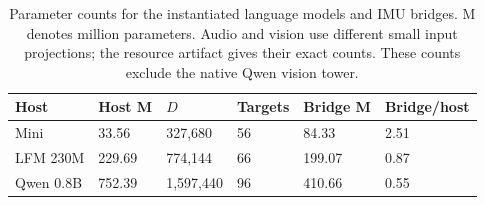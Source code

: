 \begin{table}[!htbp]\centering\small
\setlength{\tabcolsep}{4pt}
\caption{Parameter counts for the instantiated language models and IMU bridges. M denotes million parameters. Audio and vision use different small input projections; the resource artifact gives their exact counts. These counts exclude the native Qwen vision tower.}\label{tab:hosts}
\begin{tabular}{@{}llllll@{}}
\toprule
Host & Host M & $D$ & Targets & Bridge M & Bridge/host \\
\midrule
Mini & 33.56 & 327,680 & 56 & 84.33 & 2.51 \\
LFM 230M & 229.69 & 774,144 & 66 & 199.07 & 0.87 \\
Qwen 0.8B & 752.39 & 1,597,440 & 96 & 410.66 & 0.55 \\
\bottomrule
\end{tabular}
\end{table}\par
